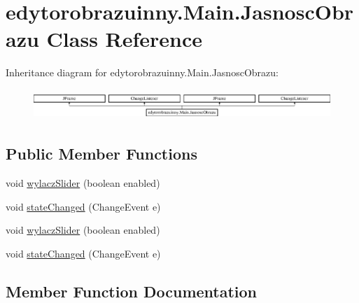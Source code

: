 \hypertarget{classedytorobrazuinny_1_1_main_1_1_jasnosc_obrazu}{}\section{edytorobrazuinny.\+Main.\+Jasnosc\+Obrazu Class Reference}
\label{classedytorobrazuinny_1_1_main_1_1_jasnosc_obrazu}
Inheritance diagram for edytorobrazuinny.\+Main.\+Jasnosc\+Obrazu\+:\begin{figure}[H]
\begin{center}
\leavevmode
\includegraphics[height=1.147541cm]{classedytorobrazuinny_1_1_main_1_1_jasnosc_obrazu}
\end{center}
\end{figure}
\subsection*{Public Member Functions}
\begin{DoxyCompactItemize}
\item 
void \hyperlink{classedytorobrazuinny_1_1_main_1_1_jasnosc_obrazu_a7d3a28f2a8ff05803fd4e37e64452da5}{wylacz\+Slider} (boolean enabled)
\item 
void \hyperlink{classedytorobrazuinny_1_1_main_1_1_jasnosc_obrazu_a2783a21f72ef6067acbaa50136aa6c87}{state\+Changed} (Change\+Event e)
\item 
void \hyperlink{classedytorobrazuinny_1_1_main_1_1_jasnosc_obrazu_a7d3a28f2a8ff05803fd4e37e64452da5}{wylacz\+Slider} (boolean enabled)
\item 
void \hyperlink{classedytorobrazuinny_1_1_main_1_1_jasnosc_obrazu_a2783a21f72ef6067acbaa50136aa6c87}{state\+Changed} (Change\+Event e)
\end{DoxyCompactItemize}


\subsection{Member Function Documentation}
\hypertarget{classedytorobrazuinny_1_1_main_1_1_jasnosc_obrazu_a2783a21f72ef6067acbaa50136aa6c87}{}
